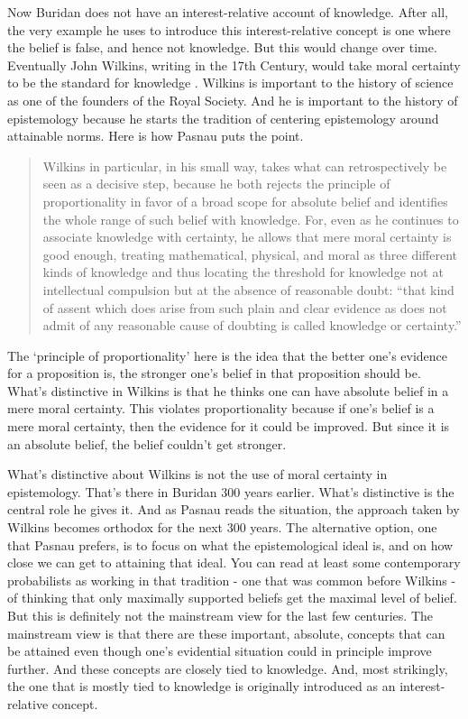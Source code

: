 \documentclass[
  11pt,
]{book}
\begin{document}
Now Buridan does not have an interest-relative account of knowledge. After all, the very example he uses to introduce this interest-relative concept is one where the belief is false, and hence not knowledge. But this would change over time. Eventually John Wilkins, writing in the 17th Century, would take moral certainty to be the standard for knowledge \citep[218]{Pasnau2017}. Wilkins is important to the history of science as one of the founders of the Royal Society. And he is important to the history of epistemology because he starts the tradition of centering epistemology around attainable norms. Here is how Pasnau puts the point.

\begin{quote}
Wilkins in particular, in his small way, takes what can retrospectively be seen as a decisive step, because he both rejects the principle of proportionality in favor of a broad scope for absolute belief and identifies the whole range of such belief with knowledge. For, even as he continues to associate knowledge with certainty, he allows that mere moral certainty is good enough, treating mathematical, physical, and moral as three different kinds of knowledge and thus locating the threshold for knowledge not at intellectual compulsion but at the absence of reasonable doubt: ``that kind of assent which does arise from such plain and clear evidence as does not admit of any reasonable cause of doubting is called knowledge or certainty.'' \citep[43]{Pasnau2017}
\end{quote}

The `principle of proportionality' here is the idea that the better one's evidence for a proposition is, the stronger one's belief in that proposition should be. What's distinctive in Wilkins is that he thinks one can have absolute belief in a mere moral certainty. This violates proportionality because if one's belief is a mere moral certainty, then the evidence for it could be improved. But since it is an absolute belief, the belief couldn't get stronger.

What's distinctive about Wilkins is not the use of moral certainty in epistemology. That's there in Buridan 300 years earlier. What's distinctive is the central role he gives it. And as Pasnau reads the situation, the approach taken by Wilkins becomes orthodox for the next 300 years. The alternative option, one that Pasnau prefers, is to focus on what the epistemological ideal is, and on how close we can get to attaining that ideal. You can read at least some contemporary probabilists as working in that tradition - one that was common before Wilkins - of thinking that only maximally supported beliefs get the maximal level of belief. But this is definitely not the mainstream view for the last few centuries. The mainstream view is that there are these important, absolute, concepts that can be attained even though one's evidential situation could in principle improve further. And these concepts are closely tied to knowledge. And, most strikingly, the one that is mostly tied to knowledge is originally introduced as an interest-relative concept.
\end{document}
